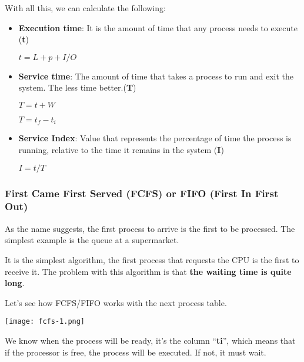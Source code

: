 With all this, we can calculate the following:

\begin{itemize}
    \item \textbf{Execution time}: It is the amount of time that any process needs to execute (\textbf{t})
    \begin{center}
        $t = L + p + I/O$
    \end{center}

    \item \textbf{Service time}: The amount of time that takes a
    process to run and exit the system. The less time better.(\textbf{T})

    \begin{center}
        $T = t + W$

        $T = t_{f} - t_{i}$
    \end{center}

    \item \textbf{Service Index}: Value that represents the percentage of
    time the process is running, relative to the time it remains in the system (\textbf{I})

    \begin{center}
        $ I = t / T$
    \end{center}
\end{itemize}


\subsubsection{First Came First Served (FCFS) or FIFO (First In First Out)}

As the name suggests, the first process to arrive is the first to be processed. The simplest example is the queue at a supermarket.

It is the simplest algorithm, the first process that requests the CPU is the first to receive it. The problem with this algorithm is that \textbf{the waiting time is quite long}.

Let's see how FCFS/FIFO works with the next process table.

\begin{center}
    \texttt{[image: fcfs-1.png]}
\end{center}

We know when the process will be ready, it's the column “\textbf{ti}”, which means that if the processor is free, the process will be executed. If not, it must wait.

